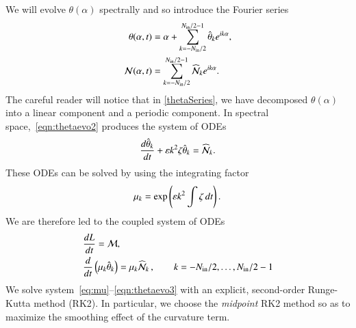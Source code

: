 \documentclass[preprint, 10pt]{elsarticle}
\begin{document}

We will evolve $\theta(\alpha)$ spectrally and so introduce the Fourier series
\begin{align}
\label{thetaSeries}
 \theta(\alpha,t) &= \alpha + \FourierSum \thhat_k e^{ i k \alpha}, \\
 \NLterm(\alpha,t)  &= \FourierSum \widehat{\NLterm}_k e^{ i k \alpha}.
\end{align}
The careful reader will notice that in \eqref{thetaSeries}, we have decomposed $\theta(\alpha)$ into a linear component and a periodic component.
In spectral space,~\eqref{eqn:thetaevo2} produces the system of ODEs
\begin{align*}
\tderiv{\thhat_k}{t} +  \eps k^2  \elfun \thhat_k = \widehat{\NLterm}_k.
\end{align*}
These ODEs can be solved by using the integrating factor
\begin{align}
\label{eq:mu}
\mu_k = \exp \left( \varepsilon k^2 \int \zeta \, dt \right).
\end{align}
We are therefore led to the coupled system of ODEs
\begin{align}
\label{eqn:Levo3}
& \tderiv{L}{t} = \Mterm, \\
\label{eqn:thetaevo3}
& \tderiv{}{t}\left( \mu_k \thhat_k \right) = \mu_k \widehat{\NLterm}_k \, ,
\qquad k = -N_\iin/2, \ldots, N_\iin/2 -1
\end{align}
We solve system~\eqref{eq:mu}--\eqref{eqn:thetaevo3} with an
explicit, second-order Runge-Kutta method (RK2). In particular, we choose the {\em midpoint} RK2 method so as to maximize the smoothing effect of the curvature term.
\end{document}
